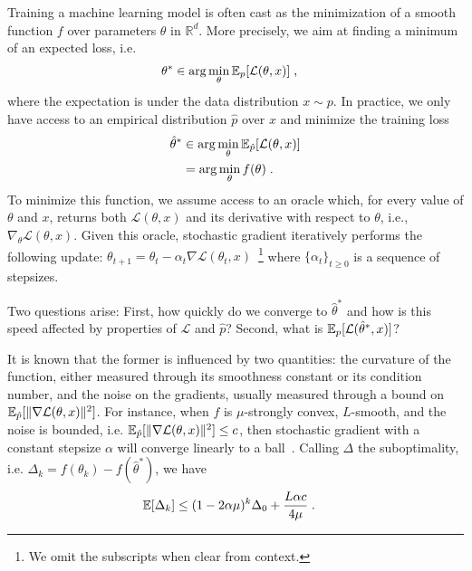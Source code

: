 Training a machine learning model is often cast as the minimization of a smooth function $f$ over parameters $\theta$ in $\mathbb{R}^d$. More precisely, we aim at finding a minimum of an expected loss, i.e.
\begin{align}
    \theta^\ast &\in \arg\min_\theta \mathbb{E}_{p} [\mathcal{L}(\theta, x)] \; ,
\end{align}
where the expectation is under the data distribution $x \sim p$. In practice, we only have access to an empirical distribution $\hat{p}$ over $x$ and minimize the training loss
\begin{align}
    \hat{\theta}^\ast   &\in \arg\min_\theta \mathbb{E}_{\hat{p}}[\mathcal{L}(\theta, x)]\\
                        &= \arg\min_\theta f(\theta) \; .
\end{align}
To minimize this function, we assume access to an oracle which, for every value of $\theta$ and $x$, returns both $\mathcal{L}(\theta, x)$ and its derivative with respect to $\theta$, i.e., $\nabla_\theta \mathcal{L}(\theta, x)$. Given this oracle, stochastic gradient iteratively performs the following update: $\theta_{t+1} = \theta_t - \alpha_t \nabla \mathcal{L}(\theta_t, x)$~\footnote{We omit the subscripts when clear from context.} where $\{\alpha_t\}_{t \geq 0}$ is a sequence of stepsizes.

Two questions arise: First, how quickly do we converge to $\hat{\theta}^\ast$ and how is this speed affected by properties of $\mathcal{L}$ and $\hat{p}$? Second, what is $\mathbb{E}_{p}[\mathcal{L}(\hat{\theta}^\ast, x)]$?

It is known that the former is influenced by two quantities: the curvature of the function, either measured through its smoothness constant or its condition number, and the noise on the gradients, usually measured through a bound on $\mathbb{E}_{\hat{p}}[\|\nabla \mathcal{L}(\theta, x)\|^2]$. For instance,  when $f$ is $\mu$-strongly convex, $L$-smooth, and the noise is bounded, i.e. $\mathbb{E}_{\hat{p}}[\|\nabla\mathcal{L}(\theta, x)\|^2] \leq c$, then stochastic gradient with a constant stepsize $\alpha$ will converge linearly to a ball~\citep{schmidt2014convergence}. Calling $\Delta$ the suboptimality, i.e. $\Delta_k = f(\theta_k) - f(\hat{\theta}^\ast)$, we have
\begin{align}
    \label{eq:sg_cvg_rate}
    \mathbb{E} [\Delta_k]   &\leq (1 - 2\alpha\mu)^k \Delta_0 + \frac{L\alpha c}{4\mu} \; .
\end{align}


